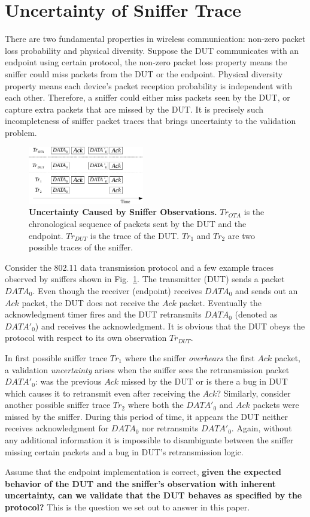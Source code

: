 \section{Uncertainty of Sniffer Trace}
\label{sec:model}

There are two fundamental properties in wireless communication: non-zero packet
loss probability and physical diversity.
%
Suppose the DUT communicates with an endpoint using certain protocol, the
non-zero packet loss property means the sniffer could miss packets from the DUT
or the
endpoint.
%
Physical diversity property means each device's packet reception probability is
independent with each other.
%
Therefore, a sniffer could either miss packets seen by the DUT, or capture
extra packets that are missed by the DUT. It is precisely such incompleteness of
sniffer packet traces that brings uncertainty to the validation problem.

\begin{figure}
  \vspace*{-5mm}
  \centering
  \includegraphics[width=0.45\textwidth]{./figures/false_pos.pdf}
  \caption{\textbf{Uncertainty Caused by Sniffer Observations.} $Tr_{OTA}$ is
    the chronological sequence of packets sent by the DUT and the endpoint.
    $Tr_{DUT}$ is the trace of the DUT. $Tr_1$ and $Tr_2$ are two possible traces
  of the sniffer.}
  \label{fig:sniffer_in_middle}
  \vspace*{-8mm}
\end{figure}

Consider the 802.11 data transmission protocol and a few example traces observed by
sniffers shown in Fig.~\ref{fig:sniffer_in_middle}.
%
The transmitter (DUT) sends a packet $DATA_0$.
%
Even though the receiver (endpoint) receives $DATA_0$ and sends out an $Ack$
packet, the DUT does not receive the $Ack$ packet.
%
Eventually the acknowledgment timer fires and the DUT retransmits $DATA_0$
(denoted as $DATA'_0$) and receives the acknowledgment.
%
It is obvious that the DUT obeys the protocol with respect to its own
observation $Tr_{DUT}$.

In first possible sniffer trace $Tr_1$ where the sniffer \textit{overhears} the
first $Ack$ packet, a validation \textit{uncertainty} arises when the sniffer
sees the retransmission packet $DATA'_0$: was the previous $Ack$ missed by the
DUT or is there a bug in DUT which causes it to retransmit even after receiving
the $Ack$?
%
Similarly, consider another possible sniffer trace
$Tr_2$ where both the $DATA'_0$ and $Ack$ packets were missed by the sniffer.
%
During this period of time, it appears the DUT neither receives acknowledgment
for $DATA_0$ nor retransmits $DATA'_0$.
%
Again, without any additional information it is impossible to disambiguate between the
sniffer missing certain packets and a bug in DUT's retransmission logic.

Assume that the endpoint implementation is correct, \textbf{given the expected
behavior of the DUT and the sniffer's observation with inherent uncertainty, can
we validate that the DUT behaves as specified by the protocol?}
%
This is the question we set out to answer in this paper.

